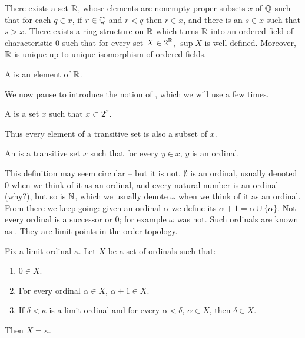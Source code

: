 \begin{theorem}[Dedekind]
There exists a set $\mathbb{R}$, whose elements are nonempty proper subsets $x$ of $\mathbb{Q}$ such that for each $q \in x$, if $r \in \mathbb{Q}$ and $r < q$ then $r \in x$, and there is an $s \in x$ such that $s > x$.
There exists a ring structure on $\mathbb{R}$ which turns $\mathbb{R}$ into an ordered field of characteristic $0$ such that for every set $X \in 2^{\mathbb{R}}$, $\sup X$ is well-defined.
Moreover, $\mathbb{R}$ is unique up to unique isomorphism of ordered fields.
\end{theorem}

\begin{definition}
A  is an element of $\mathbb{R}$.
\end{definition}

\begin{subsec}
We now pause to introduce the notion of , which we will use a few times.
\end{subsec}

\begin{definition}
A  is a set $x$ such that $x \subset 2^x$.
\end{definition}

\begin{subsec}
Thus every element of a transitive set is also a subset of $x$.
\end{subsec}

\begin{definition}
\label{ordinal dfn}
An  is a transitive set $x$ such that for every $y \in x$, $y$ is an ordinal.
\end{definition}

\begin{subsec}
This definition may seem circular -- but it is not. $\emptyset$ is an ordinal, usually denoted $0$ when we think of it as an ordinal, and every natural number is an ordinal (why?), but so is $\mathbb{N}$, which we usually denote $\omega$ when we think of it as an ordinal.
From there we keep going: given an ordinal $\alpha$ we define its  $\alpha + 1 = \alpha \cup \{\alpha\}$.
Not every ordinal is a successor or $0$; for example $\omega$ was not. Such ordinals are known as .
They are limit points in the order topology.
\end{subsec}

\begin{theorem}
\label{transfinite induction}
Fix a limit ordinal $\kappa$. Let $X$ be a set of ordinals such that:
\begin{enumerate}
\item $0 \in X$.
\item For every ordinal $\alpha \in X$, $\alpha + 1 \in X$.
\item If $\delta < \kappa$ is a limit ordinal and for every $\alpha < \delta$, $\alpha \in X$, then $\delta \in X$.
\end{enumerate}
Then $X = \kappa$.
\end{theorem}

